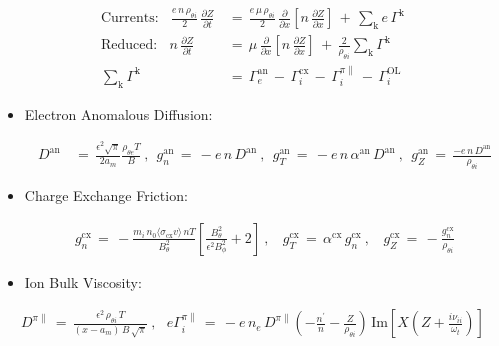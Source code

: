 \documentclass[a4paper,8pt]{article}
\begin{document}
\begin{align}
    \text{Currents:} ~~~~ \frac{e \, n \, \rho_{\theta i}}{2} \,
        \frac{\partial Z}{\partial t} \,&=\, \frac{e \, \mu \, \rho_{\theta i}}
        {2} \, \frac{\partial}{\partial x} \left[n \, \frac{\partial Z}
        {\partial x}\right] \,+\, \sum_\text{k} e \, \Gamma^\text{k} \\
    \text{Reduced:} ~~~~ n \, \frac{\partial Z}{\partial t} \,&=\, \mu \,
        \frac{\partial}{\partial x} \left[n \, \frac{\partial Z}{\partial x}
        \right] \,+\, \frac{2}{\rho_{\theta i}} \sum_\text{k} \Gamma^\text{k} \\
    \sum_\text{k} \Gamma^\text{k} \,&=\, \Gamma_e^\text{an} \,-\,
        \Gamma_i^\text{cx} \,-\, \Gamma_i^{\pi\parallel} \,-\,
        \Gamma_i^\text{OL}
\end{align}

\normalsize

\begin{itemize}
\item
  Electron Anomalous Diffusion: \small

  \begin{align}
  D^\text{an} \,&=\, \frac{\epsilon^2 \sqrt{\pi}}{2 a_m}
      \frac{\rho_{\theta e} T}{B}~,~~
      g_n^\text{an} \,=\, -e \,n\, D^\text{an}~,~~
      g_T^\text{an} \,=\, -e \,n\, \alpha^\text{an}\, D^\text{an}~,~~
      g_Z^\text{an} \,=\, \frac{-e \,n\, D^\text{an}}{\rho_{\theta i}}
  \end{align}

  \normalsize
\item
  Charge Exchange Friction: \small

  \begin{align}
  g_n^\text{cx} \,=\,
      -\frac{m_i \,n_0 \langle\sigma_\text{cx} v\rangle \,n T}{B_\theta^2}
      \left[\frac{B_\theta^2}{\epsilon^2 B_\phi^2} + 2\right]~,~~~~
      g_T^\text{cx} \,=\, \alpha^\text{cx}\,g_n^\text{cx}~,~~~~
      g_Z^\text{cx} \,=\, -\frac{g_n^\text{cx}}{\rho_{\theta i}}
  \end{align}

  \normalsize
\item
  Ion Bulk Viscosity: 
\end{itemize}

\small

\begin{align}
    D^{\pi\parallel} \,=\, \frac{\epsilon^2 \, \rho_{\theta i} \, T}
        {(x - a_m) \, B \, \sqrt{\pi}}~,~~~
    e \Gamma_i^{\pi\parallel} \,=\, -e\,n_e\,D^{\pi\parallel}
        \left(-\frac{n^\prime}{n} - \frac{Z}{\rho_{\theta i}}\right) \,
        \text{Im}\left[X\left(Z + \frac{i \nu_{ii}}{\omega_t}\right)\right]
\end{align}
\end{document}

